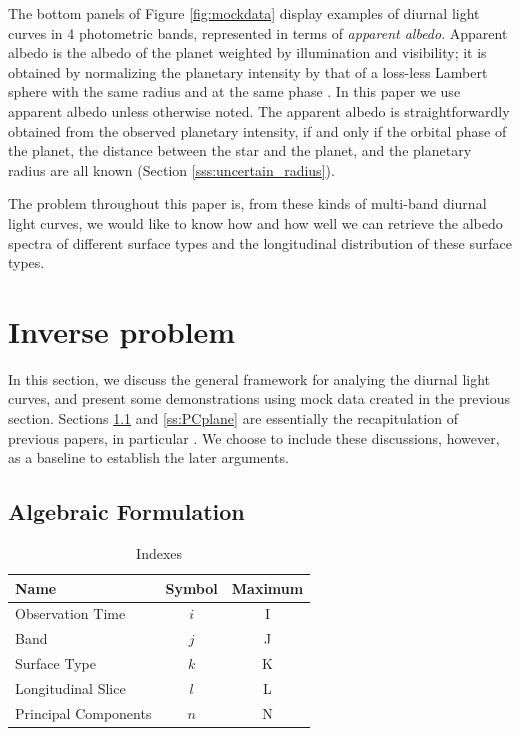 \documentclass[iop,numberedappendix,apj]{emulateapj}
\begin{document}
The bottom panels of Figure \ref{fig:mockdata} display examples of diurnal light curves in 4 photometric bands, represented in terms of {\it apparent albedo}. 
Apparent albedo is the albedo of the planet weighted by illumination and visibility; it is obtained by normalizing the planetary intensity by that of a loss-less Lambert sphere with the same radius and at the same phase \citep{Qiu2003, Seager2010}. 
In this paper we use apparent albedo unless otherwise noted. 
The apparent albedo is straightforwardly obtained from the observed planetary intensity, if and only if the orbital phase of the planet, the distance between the star and the planet, and the planetary radius are all known (Section \ref{sss:uncertain_radius}). 

The problem throughout this paper is, from these kinds of multi-band diurnal light curves, we would like to know how and how well we can retrieve the albedo spectra of different surface types and the longitudinal distribution of these surface types. 


\section{Inverse problem}
\label{s:frame}

In this section, we discuss the general framework for analying the diurnal light curves, and present some demonstrations using mock data created in the previous section. 
Sections \ref{ss:model} and \ref{ss:PCplane} are essentially the recapitulation of previous papers, in particular \citet{Cowan2013} \citep[see also][]{Cowan2009,Cowan2011,Fujii2010,Fujii2011}.  
We choose to include these discussions, however, as a baseline to establish the later arguments. 

\subsection{Algebraic Formulation}
\label{ss:model}


\begin{table}[b]
\caption{Indexes}
\begin{center}
\begin{tabular}{lcc} \hline \hline
Name & Symbol & Maximum \\ \hline
Observation Time & $i$ & I \\
Band & $j$ & J  \\
Surface Type & $k$ & K  \\
Longitudinal Slice  & $l$ & L \\ 
Principal Components & $n$ & N \\ \hline
\end{tabular}
\end{center}
\label{tab:index}
\end{table}%
\end{document}
